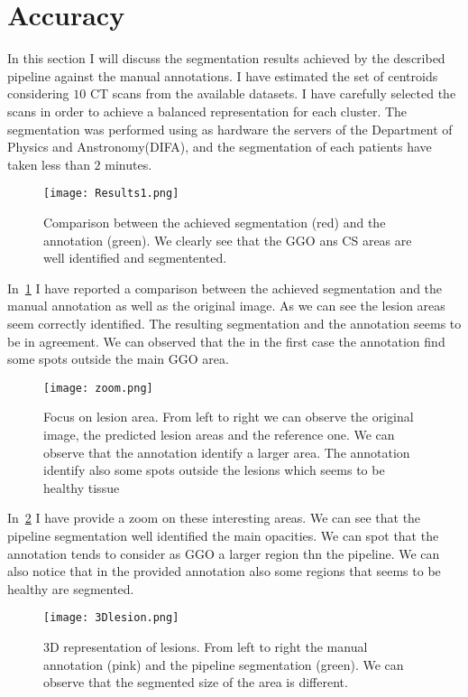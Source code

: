 \documentclass{standalone}
\begin{document}
	\section{Accuracy}
	
	In this section I will discuss the segmentation results achieved by the described pipeline against the manual annotations. I have estimated the set of centroids considering $10$ CT scans from the available datasets. I have carefully selected the scans in order to achieve a balanced representation for each cluster. The segmentation was performed using as hardware the servers of the Department of Physics and Anstronomy(DIFA), and the segmentation of each patients have taken less than $2$ minutes.
	
	\begin{figure}[h!]
		\centering 
		\texttt{[image: Results1.png]}
		\caption{Comparison between the achieved segmentation (red) and the annotation (green). We clearly see that the GGO ans CS areas are well identified and segmentented.}\label{fig:Results}
	\end{figure}



	In \figurename\,\ref{fig:Results} I have reported a comparison between the achieved segmentation and the manual annotation as well as the original image. As we can see the lesion areas seem correctly identified. The resulting segmentation and the annotation seems to be in agreement. We can observed that the in the first case the annotation find some spots outside the main GGO area. 
	
	\begin{figure}[h!]
		\centering
			\texttt{[image: zoom.png]}
		\caption{Focus on lesion area. From left to right we can observe the original image, the predicted lesion areas and the reference one. We can observe that the annotation  identify a larger area. The annotation identify also some spots outside the lesions which seems to be healthy tissue}\label{fig:zoom}
	\end{figure}

	In \figurename\,\ref{fig:zoom} I have provide a zoom on these interesting areas. We can see that the pipeline segmentation well identified the main opacities. We can spot that the  annotation tends to consider as GGO a larger region thn the pipeline. We can also notice that in the provided annotation also some regions that seems to be healthy are segmented.
	
		
	\begin{figure}[h!]
		
		\centering 
		\texttt{[image: 3Dlesion.png]}
		\caption{3D representation of lesions. From left to right the manual annotation (pink) and the pipeline segmentation (green). We can observe that the segmented size of the area is different.}\label{fig:3Dlabel}		
	\end{figure}
	
\end{document}
